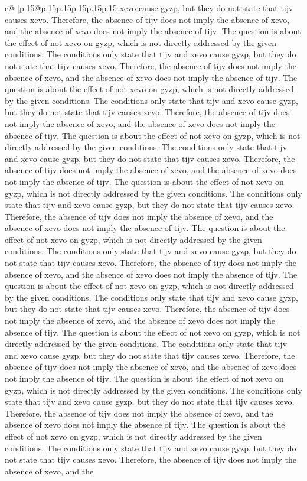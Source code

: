 \documentclass{article}
\begin{document}
{\begin{supertabular}{c@{$\;$}|p{.15\linewidth}@{}p{.15\linewidth}p{.15\linewidth}p{.15\linewidth}p{.15\linewidth}p{.15\linewidth}}
{{{xevo cause gyzp, but they do not state that tijv causes xevo. Therefore, the absence of tijv does not imply the absence of xevo, and the absence of xevo does not imply the absence of tijv. The question is about the effect of not xevo on gyzp, which is not directly addressed by the given conditions. The conditions only state that tijv and xevo cause gyzp, but they do not state that tijv causes xevo. Therefore, the absence of tijv does not imply the absence of xevo, and the absence of xevo does not imply the absence of tijv. The question is about the effect of not xevo on gyzp, which is not directly addressed by the given conditions. The conditions only state that tijv and xevo cause gyzp, but they do not state that tijv causes xevo. Therefore, the absence of tijv does not imply the absence of xevo, and the absence of xevo does not imply the absence of tijv. The question is about the effect of not xevo on gyzp, which is not directly addressed by the given conditions. The conditions only state that tijv and xevo cause gyzp, but they do not state that tijv causes xevo. Therefore, the absence of tijv does not imply the absence of xevo, and the absence of xevo does not imply the absence of tijv. The question is about the effect of not xevo on gyzp, which is not directly addressed by the given conditions. The conditions only state that tijv and xevo cause gyzp, but they do not state that tijv causes xevo. Therefore, the absence of tijv does not imply the absence of xevo, and the absence of xevo does not imply the absence of tijv. The question is about the effect of not xevo on gyzp, which is not directly addressed by the given conditions. The conditions only state that tijv and xevo cause gyzp, but they do not state that tijv causes xevo. Therefore, the absence of tijv does not imply the absence of xevo, and the absence of xevo does not imply the absence of tijv. The question is about the effect of not xevo on gyzp, which is not directly addressed by the given conditions. The conditions only state that tijv and xevo cause gyzp, but they do not state that tijv causes xevo. Therefore, the absence of tijv does not imply the absence of xevo, and the absence of xevo does not imply the absence of tijv. The question is about the effect of not xevo on gyzp, which is not directly addressed by the given conditions. The conditions only state that tijv and xevo cause gyzp, but they do not state that tijv causes xevo. Therefore, the absence of tijv does not imply the absence of xevo, and the absence of xevo does not imply the absence of tijv. The question is about the effect of not xevo on gyzp, which is not directly addressed by the given conditions. The conditions only state that tijv and xevo cause gyzp, but they do not state that tijv causes xevo. Therefore, the absence of tijv does not imply the absence of xevo, and the absence of xevo does not imply the absence of tijv. The question is about the effect of not xevo on gyzp, which is not directly addressed by the given conditions. The conditions only state that tijv and xevo cause gyzp, but they do not state that tijv causes xevo. Therefore, the absence of tijv does not imply the absence of xevo, and the }}}
\end{supertabular}}
\end{document}
